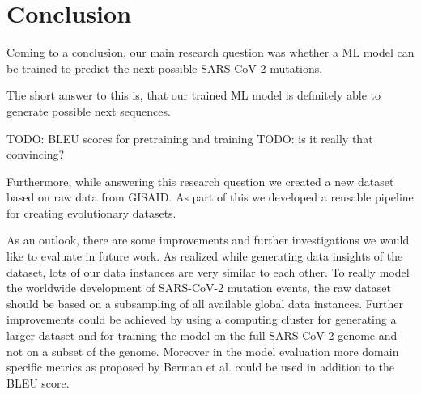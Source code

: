 \section{Conclusion} \label{conclusion}

Coming to a conclusion, our main research question was whether a \ac{ML} model can be trained to predict the next possible \ac{SARS-CoV-2} mutations.

The short answer to this is, that our trained \ac{ML} model is definitely able to generate possible next sequences. 

TODO: BLEU scores for pretraining and training
TODO: is it really that convincing?

Furthermore, while answering this research question we created a new dataset based on raw data from \ac{GISAID}. As part of this we developed a reusable pipeline for creating evolutionary datasets.

\vspace{0.5cm}

As an outlook, there are some improvements and further investigations we would like to evaluate in future work. As realized while generating data insights of the dataset, lots of our data instances are very similar to each other. To really model the worldwide development of \ac{SARS-CoV-2} mutation events, the raw dataset should be based on a subsampling of all available global data instances. Further improvements could be achieved by using a computing cluster for generating a larger dataset and for training the model on the full \ac{SARS-CoV-2} genome and not on a subset of the genome. Moreover in the model evaluation more domain specific metrics as proposed by Berman et al. \cite{Berman2020} could be used in addition to the BLEU score.
